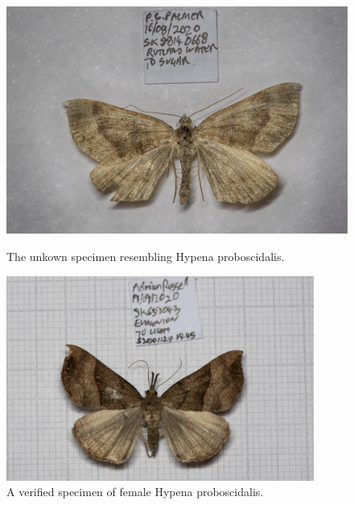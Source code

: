 \documentclass[]{article}
\begin{document}
\begin{figure}
	\centering
	\begin{minipage}{0.45\textwidth}
		\centering
	\includegraphics[width=0.9\linewidth]{202009131026PJP-1}
	\caption{The unkown specimen resembling Hypena proboscidalis.}
	\label{fig:202009131026pjp-1}
	\end{minipage}\hfill
	\begin{minipage}{0.45\textwidth}
		\centering
		\includegraphics[width=0.9\textwidth]{S202012271445-1} %
		\caption{A verified specimen of female Hypena proboscidalis.}
		\label{fig:S202012271446-1}
	\end{minipage}
\end{figure}
\end{document}
